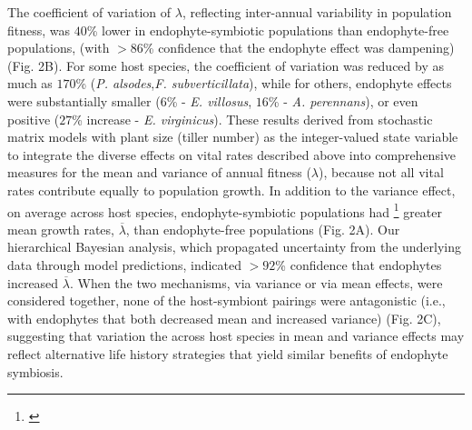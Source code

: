 \documentclass[12pt]{article}
\newcommand{\tom}[2]{{\color{red}{#1}}\footnote{\textit{\color{red}{#2}}}}
\begin{document}
 The coefficient of variation of $\lambda$, reflecting inter-annual variability in population fitness, was $40$\% lower in endophyte-symbiotic populations than endophyte-free populations, (with $>86$\% confidence that the endophyte effect was dampening) (Fig. 2B).
For some host species, the coefficient of variation was reduced by as much as $170$\% (\emph{P. alsodes},\emph{F. subverticillata}), while for others, endophyte effects were substantially smaller ($6$\% - \emph{E. villosus}, $16$\% - \emph{A. perennans}), or even positive ($27$\% increase - \emph{E. virginicus}).
These results derived from stochastic matrix models with plant size (tiller number) as the integer-valued state variable to integrate the diverse effects on vital rates described above into comprehensive measures for the mean and variance of annual fitness ($\lambda$), because not all vital rates contribute equally to population growth.
In addition to the variance effect, on average across host species, endophyte-symbiotic populations had \tom{$9$\%}{would like to discuss} greater mean growth rates, $\overline{\lambda}$, than endophyte-free populations (Fig. 2A). 
Our hierarchical Bayesian analysis, which propagated uncertainty from the underlying data through model predictions, indicated $>92$\% confidence that endophytes increased $\overline{\lambda}$.
When the two mechanisms, via variance or via mean effects, were considered together, none of the host-symbiont pairings were antagonistic (i.e., with endophytes that both decreased mean and increased variance) (Fig. 2C), suggesting that variation the across host species in mean and variance effects may reflect alternative life history strategies that yield similar benefits of endophyte symbiosis.
\end{document}
